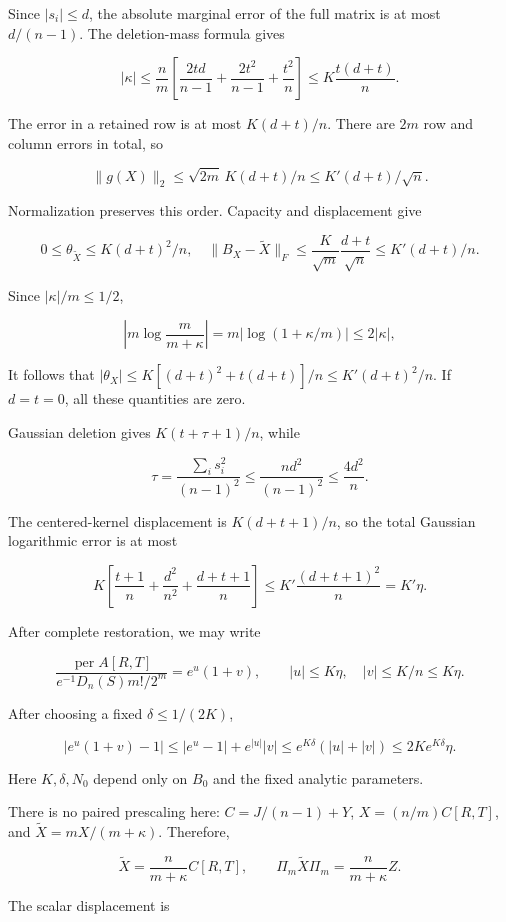\documentclass[11pt,a4paper]{article}
\begin{document}
Since \(|s_i|\le d\), the absolute marginal error of the full matrix is at most \(d/(n-1)\). The deletion-mass formula gives

\[
|\kappa|\le\frac nm\left[\frac{2td}{n-1}+\frac{2t^2}{n-1}+\frac{t^2}n\right]
\le K\frac{t(d+t)}n.
\]

The error in a retained row is at most \(K(d+t)/n\). There are \(2m\) row and column errors in total, so

\[
\|g(X)\|_2\le\sqrt{2m}\,K(d+t)/n
\le K'(d+t)/\sqrt n.
\]

Normalization preserves this order. Capacity and displacement give

\[
0\le\theta_{\widetilde X}\le K(d+t)^2/n,
\quad
\|B_X-\widetilde X\|_F\le\frac K{\sqrt m}\frac{d+t}{\sqrt n}
\le K'(d+t)/n.
\]

Since \(|\kappa|/m\le1/2\),

\[
\left|m\log\frac m{m+\kappa}\right|
=m|\log(1+\kappa/m)|\le2|\kappa|,
\]

It follows that \(|\theta_X|\le K[(d+t)^2+t(d+t)]/n\le K'(d+t)^2/n\). If \(d=t=0\), all these quantities are zero.

Gaussian deletion gives \(K(t+\tau+1)/n\), while

\[
\tau=\frac{\sum_i s_i^2}{(n-1)^2}\le\frac{nd^2}{(n-1)^2}\le\frac{4d^2}n.
\]

The centered-kernel displacement is \(K(d+t+1)/n\), so the total Gaussian logarithmic error is at most

\[
K\left[\frac{t+1}n+\frac{d^2}{n^2}+\frac{d+t+1}n\right]
\le K'\frac{(d+t+1)^2}n=K'\eta.
\]

After complete restoration, we may write

\[
\frac{\operatorname{per}A[R,T]}{e^{-1}D_n(S)m!/2^m}
=e^u(1+v),\qquad |u|\le K\eta,\quad |v|\le K/n\le K\eta.
\]

After choosing a fixed \(\delta\le1/(2K)\),

\[
|e^u(1+v)-1|
\le|e^u-1|+e^{|u|}|v|
\le e^{K\delta}(|u|+|v|)
\le2Ke^{K\delta}\eta.
\]

Here \(K,\delta,N_0\) depend only on \(B_0\) and the fixed analytic parameters.

There is no paired prescaling here: \(C=J/(n-1)+Y\), \(X=(n/m)C[R,T]\), and \(\widetilde X=mX/(m+\kappa)\). Therefore,

\[
\widetilde X=\frac n{m+\kappa}C[R,T],\qquad
\Pi_m\widetilde X\Pi_m=\frac n{m+\kappa}Z.
\]

The scalar displacement is
\end{document}
